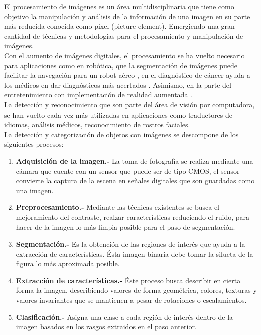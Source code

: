 \documentclass[a4paper, 11pt]{article}
\begin{document}

El procesamiento de imágenes es un área multidisciplinaria que tiene como objetivo la manipulación y análisis de la información de una imagen en su parte más reducida conocida como pixel (picture element). Emergiendo una gran cantidad de técnicas y metodologías para el procesamiento y manipulación de imágenes.\\

Con el aumento de imágenes digitales, el procesamiento se ha vuelto necesario para aplicaciones como en robótica, que la segmentación de imágenes puede facilitar la navegación para un robot aéreo \cite{smolyanskiy2017lowflying}, en el diagnóstico de cáncer ayuda a los médicos en dar diagnósticos más acertados \cite{10059977}. Asimismo, en la parte del entretenimiento con implementación de realidad aumentada \cite{8776989} .\\

La detección y reconocimiento que son parte del área de visión por computadora, se han vuelto cada vez más utilizadas en aplicaciones como traductores de idiomas, análisis médicos, reconocimiento de rostros faciales.\\

La detección y categorización de objetos con imágenes se descompone de los siguientes procesos:

\begin{enumerate}
\item \textbf{Adquisición de la imagen.-} La toma de fotografía se realiza mediante una cámara  que cuente con un sensor que puede ser de tipo CMOS, el sensor convierte la captura de la escena en señales digitales que son guardadas como una imagen.
\item \textbf{Preprocesamiento.-} Mediante las técnicas existentes se busca el mejoramiento del contraste, realzar características reduciendo el ruido, para hacer de la imagen lo más limpia posible para el paso de segmentación. 
\item \textbf{Segmentación.-} Es la obtención de las regiones de interés que ayuda a la extracción de características. Ésta imagen binaria debe tomar la silueta de la figura lo más aproximada posible.
\item \textbf{Extracción de características.-} Éste proceso busca describir en cierta forma la imagen, describiendo valores de forma geométrica, colores, texturas y valores invariantes que se mantienen a pesar de rotaciones o escalamientos.
\item \textbf{Clasificación.-} Asigna una clase a cada región de interés dentro de la imagen basados en los rasgos extraidos en el paso anterior.
\end{enumerate}
\end{document}

